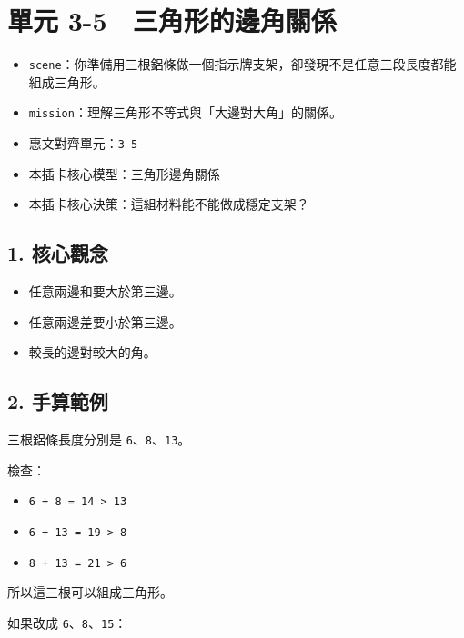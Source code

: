 \documentclass[
  chinese,
  12pt,
  a4paper,
  oneside]{article}
\providecommand{\tightlist}{%
  \setlength{\itemsep}{0pt}\setlength{\parskip}{0pt}}
\begin{document}
\newpage

\section{單元
3-5　三角形的邊角關係}\label{ux55aeux5143-3-5-ux4e09ux89d2ux5f62ux7684ux908aux89d2ux95dcux4fc2}

\begin{itemize}
\tightlist
\item
  \texttt{scene}：你準備用三根鋁條做一個指示牌支架，卻發現不是任意三段長度都能組成三角形。
\item
  \texttt{mission}：理解三角形不等式與「大邊對大角」的關係。
\item
  惠文對齊單元：\texttt{3-5}
\item
  本插卡核心模型：三角形邊角關係
\item
  本插卡核心決策：這組材料能不能做成穩定支架？
\end{itemize}

\subsection{1. 核心觀念}\label{ux6838ux5fc3ux89c0ux5ff5-3}

\begin{itemize}
\tightlist
\item
  任意兩邊和要大於第三邊。
\item
  任意兩邊差要小於第三邊。
\item
  較長的邊對較大的角。
\end{itemize}

\subsection{2. 手算範例}\label{ux624bux7b97ux7bc4ux4f8b-6}

三根鋁條長度分別是 \texttt{6}、\texttt{8}、\texttt{13}。

檢查：

\begin{itemize}
\tightlist
\item
  \texttt{6\ +\ 8\ =\ 14\ \textgreater{}\ 13}
\item
  \texttt{6\ +\ 13\ =\ 19\ \textgreater{}\ 8}
\item
  \texttt{8\ +\ 13\ =\ 21\ \textgreater{}\ 6}
\end{itemize}

所以這三根可以組成三角形。

如果改成 \texttt{6}、\texttt{8}、\texttt{15}：
\end{document}
